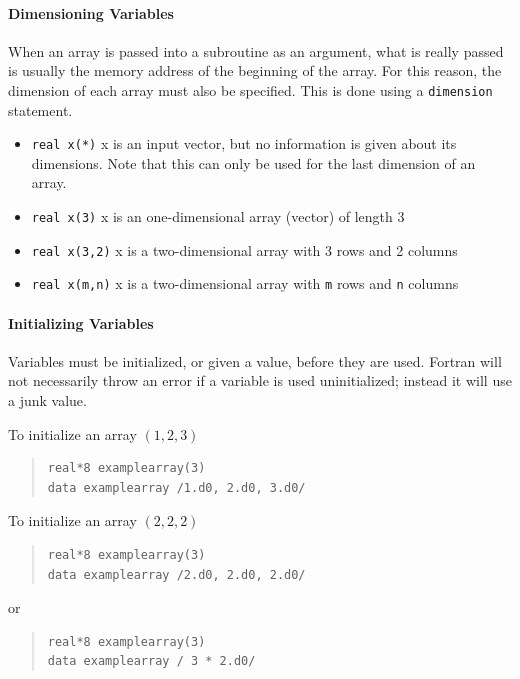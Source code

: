 \documentclass[10pt,letterpaper,oneside]{report}
\begin{document}
\paragraph{Dimensioning Variables}
When an array is passed into a subroutine as an argument, what is really passed is usually the memory address of the beginning of the array.  For this reason, the dimension of each array must also be specified.  This is done using a \texttt{dimension} statement.
\begin{itemize}
\item \texttt{real x(*)} x is an input vector, but no information is given about its dimensions.  Note that this can only be used for the last dimension of an array.
\item \texttt{real x(3)} x is an one-dimensional array (vector) of length 3
\item \texttt{real x(3,2)} x is a two-dimensional array with 3 rows and 2 columns
\item \texttt{real x(m,n)} x is a two-dimensional array with \texttt{m} rows and \texttt{n} columns 
\end{itemize}

\paragraph{Initializing Variables}
Variables must be initialized, or given a value, before they are used.  Fortran will not necessarily throw an error if a variable is used uninitialized; instead it will use a junk value.  

To initialize an array $(1,2,3)$ 
\begin{quote}\begin{lstlisting}
real*8 examplearray(3)
data examplearray /1.d0, 2.d0, 3.d0/
\end{lstlisting}\end{quote}

To initialize an array $(2,2,2)$
\begin{quote}\begin{lstlisting}
real*8 examplearray(3)
data examplearray /2.d0, 2.d0, 2.d0/
\end{lstlisting}\end{quote}
or
\begin{quote}\begin{lstlisting}
real*8 examplearray(3)
data examplearray / 3 * 2.d0/
\end{lstlisting}\end{quote}
\end{document}
